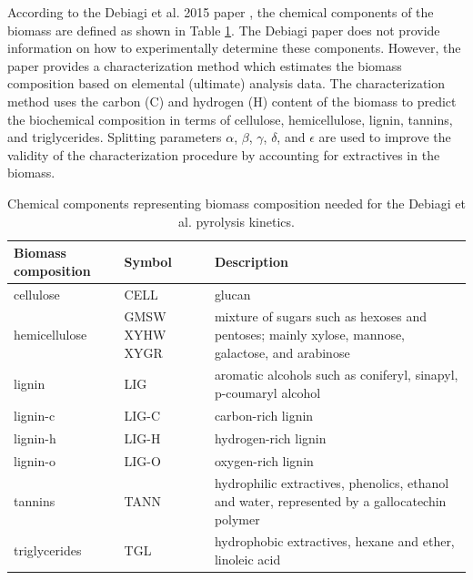 \documentclass[12pt,titlepage]{article}
\begin{document}
According to the Debiagi et al. 2015 paper \cite{Debiagi-2015}, the chemical components of the biomass are defined as shown in Table \ref{tab:chem-components}. The Debiagi paper does not provide information on how to experimentally determine these components. However, the paper provides a characterization method which estimates the biomass composition based on elemental (ultimate) analysis data. The characterization method uses the carbon (C) and hydrogen (H) content of the biomass to predict the biochemical composition in terms of cellulose, hemicellulose, lignin, tannins, and triglycerides. Splitting parameters $\alpha$, $\beta$, $\gamma$, $\delta$, and $\epsilon$ are used to improve the validity of the characterization procedure by accounting for extractives in the biomass.

\begin{table}[H]
    \centering
    \caption{Chemical components representing biomass composition needed for the Debiagi et al. pyrolysis kinetics.}
    \label{tab:chem-components}
    \begin{tabular}{lp{2cm}p{7cm}}
        \toprule
        Biomass composition & Symbol & Description \\
        \midrule
        cellulose     & CELL & glucan \\
        \addlinespace[0.2in]
        hemicellulose & GMSW XYHW XYGR & mixture of sugars such as hexoses and pentoses; mainly xylose, mannose, galactose, and arabinose \\
        \addlinespace[0.2in]
        lignin        & LIG & aromatic alcohols such as coniferyl, sinapyl, p-coumaryl alcohol\\
        \addlinespace[0.2in]
        lignin-c      & LIG-C & carbon-rich lignin \\
        \addlinespace[0.2in]
        lignin-h      & LIG-H & hydrogen-rich lignin \\
        \addlinespace[0.2in]
        lignin-o      & LIG-O & oxygen-rich lignin \\
        \addlinespace[0.2in]
        tannins       & TANN & hydrophilic extractives, phenolics, ethanol and water, represented by a gallocatechin polymer \\
        \addlinespace[0.2in]
        triglycerides & TGL & hydrophobic extractives, hexane and ether, linoleic acid \\
        \bottomrule
    \end{tabular}
\end{table}
\end{document}
